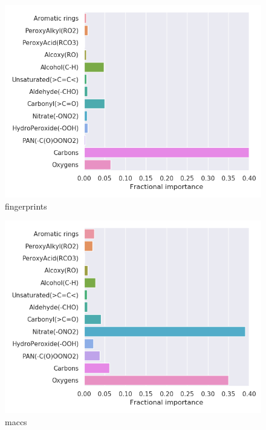 \begin{subfigure}[b]{0.4\textwidth}
    \centering
    \includegraphics[width=\textwidth]{outputs/AE/fingerprints/legend.png}
    \caption{fingerprints}
    \label{fig:legend_AE_fingerprints}
\end{subfigure}
\begin{subfigure}[b]{0.4\textwidth}
    \centering
    \includegraphics[width=\textwidth]{outputs/AE/maccs/legend.png}
    \caption{maccs}
    \label{fig:legend_AE_maccs}
\end{subfigure}
